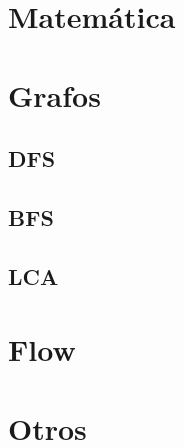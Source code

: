 \documentclass[10pt,landscape,twocolumn,a4paper,notitlepage]{article}
\begin{document}
\section{Matemática}


\section{Grafos}
\subsection{DFS}
\subsection{BFS}
\subsection{LCA}


\section{Flow}



\section{Otros}


\end{document}
